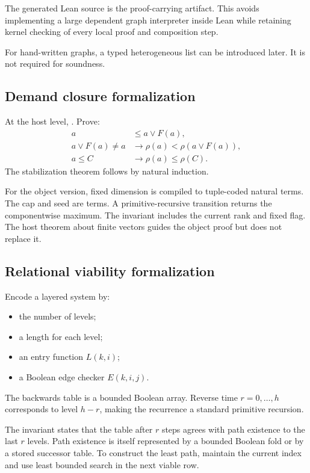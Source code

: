 The generated Lean source is the proof-carrying artifact.  This avoids implementing a large dependent graph interpreter inside Lean while retaining kernel checking of every local proof and composition step.

For hand-written graphs, a typed heterogeneous list can be introduced later.  It is not required for soundness.

\subsection{Demand closure formalization}

At the host level, .  Prove:
\begin{align*}
 a&\le a\vee F(a),\\
 a\vee F(a)\ne a&\to \rho(a)<\rho(a\vee F(a)),\\
 a\le C&\to\rho(a)\le\rho(C).
\end{align*}
The stabilization theorem follows by natural induction.

For the object version, fixed dimension is compiled to tuple-coded natural terms.  The cap and seed are terms.  A primitive-recursive transition returns the componentwise maximum.  The invariant includes the current rank and fixed flag.  The host theorem about finite vectors guides the object proof but does not replace it.

\subsection{Relational viability formalization}

Encode a layered system by:
\begin{itemize}
\item the number of levels;
\item a length for each level;
\item an entry function \(L(k,i)\);
\item a Boolean edge checker \(E(k,i,j)\).
\end{itemize}
The backwards table is a bounded Boolean array.  Reverse time \(r=0,\ldots,h\) corresponds to level \(h-r\), making the recurrence a standard primitive recursion.

The invariant states that the table after \(r\) steps agrees with path existence to the last \(r\) levels.  Path existence is itself represented by a bounded Boolean fold or by a stored successor table.  To construct the least path, maintain the current index and use least bounded search in the next viable row.

